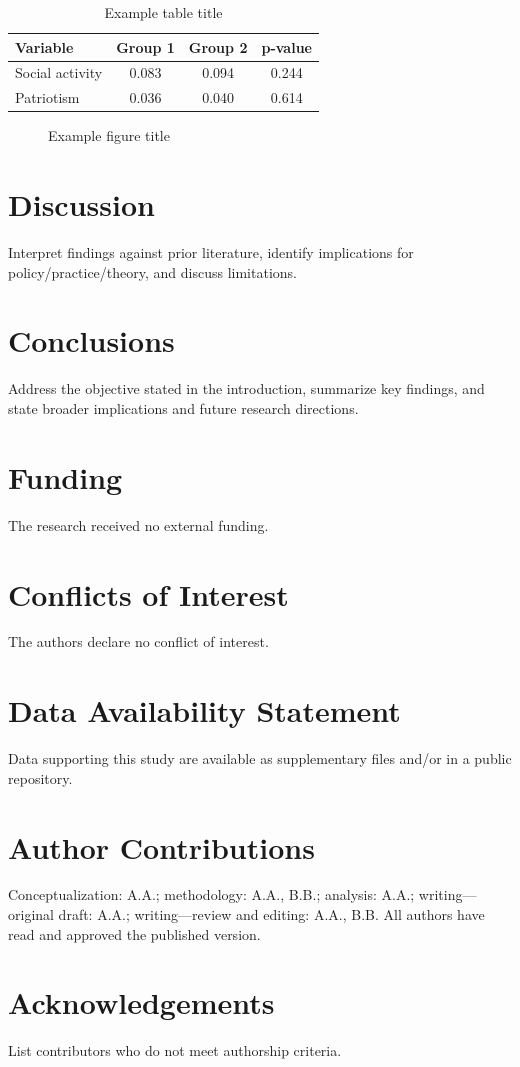 \documentclass[12pt,a4paper]{article}
\begin{document}
\begin{table}[htbp]
  \centering
  \caption{Example table title}
  \begin{tabular}{lccc}
    \toprule
    Variable & Group 1 & Group 2 & p-value \\
    \midrule
    Social activity & 0.083 & 0.094 & 0.244 \\
    Patriotism      & 0.036 & 0.040 & 0.614 \\
    \bottomrule
  \end{tabular}
\end{table}

\begin{figure}[htbp]
  \centering
  \fbox{\rule{0pt}{45mm}\rule{0.85\linewidth}{0pt}}
  \caption{Example figure title}
\end{figure}

\section{Discussion}
Interpret findings against prior literature, identify implications for policy/practice/theory, and discuss limitations.

\section{Conclusions}
Address the objective stated in the introduction, summarize key findings, and state broader implications and future research directions.

\section*{Funding}
The research received no external funding.

\section*{Conflicts of Interest}
The authors declare no conflict of interest.

\section*{Data Availability Statement}
Data supporting this study are available as supplementary files and/or in a public repository.

\section*{Author Contributions}
Conceptualization: A.A.; methodology: A.A., B.B.; analysis: A.A.; writing---original draft: A.A.; writing---review and editing: A.A., B.B. All authors have read and approved the published version.

\section*{Acknowledgements}
List contributors who do not meet authorship criteria.

\printbibliography[title={References}]
\end{document}
